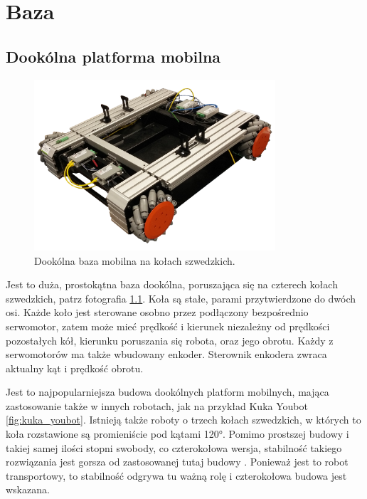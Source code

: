 \chapter{Baza}
\label{sec:robot}
\section{Dookólna platforma mobilna}
	\begin{figure}[H]
	\centering
	\includegraphics[width=0.8\textwidth]{graphics/base_photo.png}
	\caption{Dookólna baza mobilna na kołach szwedzkich.}
	\label{fig:base_photo}
	\end{figure} 

	Jest to duża, prostokątna baza dookólna, poruszająca się na czterech kołach szwedzkich, patrz fotografia \ref{fig:base_photo}.
	Koła są stałe, parami przytwierdzone do dwóch osi.
	Każde koło jest sterowane osobno przez podłączony bezpośrednio serwomotor, 
	zatem może mieć prędkość i kierunek niezależny od prędkości pozostałych kół, kierunku poruszania się robota, oraz jego obrotu.
	Każdy z serwomotorów ma także wbudowany enkoder.
	Sterownik enkodera zwraca aktualny kąt i prędkość obrotu.

	Jest to najpopularniejsza budowa dookólnych platform mobilnych, mająca zastosowanie także w innych robotach, jak na przykład Kuka Youbot \ref{fig:kuka_youbot}.
	Istnieją także roboty o trzech kołach szwedzkich, w których to koła rozstawione są promieniście pod kątami 120°.
	Pomimo prostszej budowy i takiej samej ilości stopni swobody, co czterokołowa wersja, stabilność takiego rozwiązania jest gorsza od zastosowanej tutaj budowy \cite{extra_axis}.
	Ponieważ jest to robot transportowy, to stabilność odgrywa tu ważną rolę i czterokołowa budowa jest wskazana.

